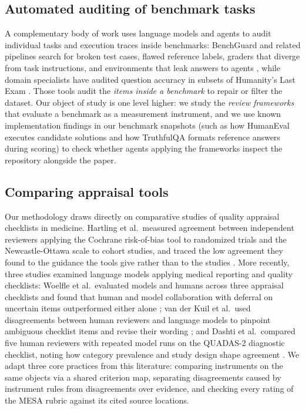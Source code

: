 \documentclass[10pt,conference]{IEEEtran}
\begin{document}
\subsection{Automated auditing of benchmark tasks}
A complementary body of work uses language models and agents to audit individual tasks and execution traces inside benchmarks: BenchGuard and related pipelines search for broken test cases, flawed reference labels, graders that diverge from task instructions, and environments that leak answers to agents \cite{tu_benchguard_2026,wang_auto_benchmark_audit_2026,suh_agentsuite_2026,mohl_transcript_flaws_2026}, while domain specialists have audited question accuracy in subsets of Humanity's Last Exam \cite{skarlinski_futurehouse_hle_2025}. Those tools audit the \emph{items inside a benchmark} to repair or filter the dataset. Our object of study is one level higher: we study the \emph{review frameworks} that evaluate a benchmark as a measurement instrument, and we use known implementation findings in our benchmark snapshots (such as how HumanEval executes candidate solutions and how TruthfulQA formats reference answers during scoring) to check whether agents applying the frameworks inspect the repository alongside the paper.

\subsection{Comparing appraisal tools}
Our methodology draws directly on comparative studies of quality appraisal checklists in medicine. Hartling et al.\ measured agreement between independent reviewers applying the Cochrane risk-of-bias tool to randomized trials and the Newcastle-Ottawa scale to cohort studies, and traced the low agreement they found to the guidance the tools give rather than to the studies \cite{hartling_rand_2012}. More recently, three studies examined language models applying medical reporting and quality checklists: Woelfle et al.\ evaluated models and humans across three appraisal checklists and found that human and model collaboration with deferral on uncertain items outperformed either alone \cite{woelfle_appraisal_llm_2024}; van der Kuil et al.\ used disagreements between human reviewers and language models to pinpoint ambiguous checklist items and revise their wording \cite{vanderkuil_checklist_disagreement_2026}; and Dashti et al.\ compared five human reviewers with repeated model runs on the QUADAS-2 diagnostic checklist, noting how category prevalence and study design shape agreement \cite{dashti_quadas2_2026}. We adapt three core practices from this literature: comparing instruments on the same objects via a shared criterion map, separating disagreements caused by instrument rules from disagreements over evidence, and checking every rating of the MESA rubric against its cited source locations.
\end{document}
